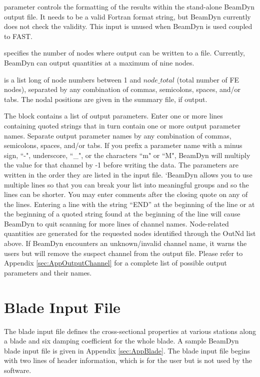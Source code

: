  parameter controls the formatting of the results within the stand-alone BeamDyn output file. 
It needs to be a valid Fortran format string, but BeamDyn currently does not check the validity. 
This input is unused when BeamDyn is used coupled to FAST.

 specifies the number of nodes where output can be written to a file. 
Currently, BeamDyn can output quantities at a maximum of nine nodes. 

 is a list  long of node numbers between 1 and $node\_total$ (total number of FE nodes), separated by any combination of commas, semicolons, spaces, and/or tabs.   
The nodal positions are given in the summary file, if output.

The  block contains a list of output parameters. 
Enter one or more lines containing quoted strings that in turn contain one or more output parameter names.  
Separate output parameter names by any combination of commas, semicolons, spaces, and/or tabs.  
If you prefix a parameter name with a minus sign, ``-", underscore, ``\_", or the characters ``m" or ``M", BeamDyn will multiply the value for that channel by -1 before writing the data.  
The parameters are written in the order they are listed in the input file.  
`BeamDyn allows you to use multiple lines so that you can break your list into meaningful groups and so the lines can be shorter. 
You may enter comments after the closing quote on any of the lines.  
Entering a line with the string ``END'' at the beginning of the line or at the beginning of a quoted string found at the beginning of the line will cause BeamDyn to quit scanning for more lines of channel names.  
Node-related quantities are generated for the requested nodes identified through the OutNd list above.  
If BeamDyn encounters an unknown/invalid channel name, it warns the users but will remove the suspect channel from the output file. 
Please refer to Appendix \ref{sec:AppOutputChannel} for a complete list of possible output parameters and their names.

\section{Blade Input File}

The blade input file defines the cross-sectional properties at various stations along a blade and six damping coefficient for the whole blade. 
A sample BeamDyn blade input file is given in Appendix \ref{sec:AppBlade}. 
The blade input file begins with two lines of header information, which is for the user but is not used  by the software.

